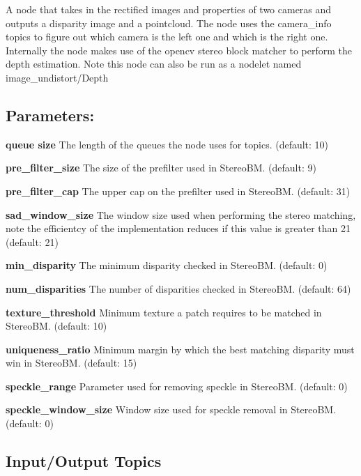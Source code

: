 A node that takes in the rectified images and properties of two cameras and outputs a disparity image and a pointcloud. The node uses the camera\+\_\+info topics to figure out which camera is the left one and which is the right one. Internally the node makes use of the opencv stereo block matcher to perform the depth estimation. Note this node can also be run as a nodelet named image\+\_\+undistort/\+Depth\hypertarget{md_vision_layer_image_undistort_README_autotoc_md107}{}\subsection{Parameters\+:}\label{md_vision_layer_image_undistort_README_autotoc_md107}

\begin{DoxyItemize}
\item {\bfseries queue size} The length of the queues the node uses for topics. (default\+: 10)
\item {\bfseries pre\+\_\+filter\+\_\+size} The size of the prefilter used in Stereo\+BM. (default\+: 9)
\item {\bfseries pre\+\_\+filter\+\_\+cap} The upper cap on the prefilter used in Stereo\+BM. (default\+: 31)
\item {\bfseries sad\+\_\+window\+\_\+size} The window size used when performing the stereo matching, note the efficientcy of the implementation reduces if this value is greater than 21 (default\+: 21)
\item {\bfseries min\+\_\+disparity} The minimum disparity checked in Stereo\+BM. (default\+: 0)
\item {\bfseries num\+\_\+disparities} The number of disparities checked in Stereo\+BM. (default\+: 64)
\item {\bfseries texture\+\_\+threshold} Minimum texture a patch requires to be matched in Stereo\+BM. (default\+: 10)
\item {\bfseries uniqueness\+\_\+ratio} Minimum margin by which the best matching disparity must \textquotesingle{}win\textquotesingle{} in Stereo\+BM. (default\+: 15)
\item {\bfseries speckle\+\_\+range} Parameter used for removing speckle in Stereo\+BM. (default\+: 0)
\item {\bfseries speckle\+\_\+window\+\_\+size} Window size used for speckle removal in Stereo\+BM. (default\+: 0)
\end{DoxyItemize}\hypertarget{md_vision_layer_image_undistort_README_autotoc_md108}{}\subsection{Input/\+Output Topics}\label{md_vision_layer_image_undistort_README_autotoc_md108}

